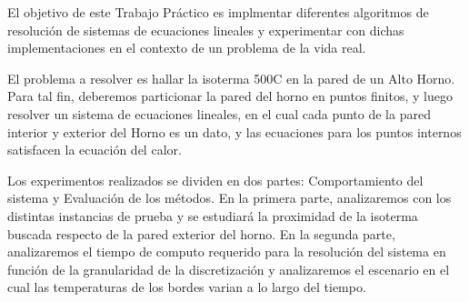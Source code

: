 El objetivo de este Trabajo Práctico es implmentar diferentes algoritmos de resolución de sistemas de ecuaciones lineales y experimentar con dichas implementaciones en el contexto de un problema de la vida real.

El problema a resolver es hallar la isoterma 500C en la pared de un Alto Horno. Para tal fin, deberemos particionar la pared del horno en puntos finitos, y luego resolver un sistema de ecuaciones lineales, en el cual cada punto de la pared interior y exterior del Horno es un dato, y las ecuaciones para los puntos internos satisfacen la ecuación del calor.

Los experimentos realizados se dividen en dos partes: Comportamiento del sistema y Evaluación de los métodos. En la primera parte, analizaremos con los  distintas instancias de prueba y se estudiará la proximidad de la isoterma buscada respecto de la pared exterior del horno. En la segunda parte, analizaremos el tiempo de computo requerido para la resolución del sistema en función de la granularidad de la discretización y analizaremos el escenario en el cual las temperaturas de los bordes varian a lo largo del tiempo.
